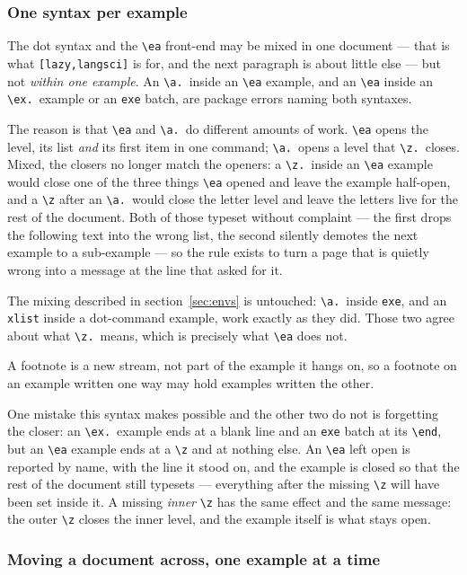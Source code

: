 \documentclass[11pt,a4paper]{article}
\newcommand{\cs}[1]{\texttt{\textbackslash #1}}
\newcommand{\opt}[1]{\texttt{#1}}
\begin{document}
\subsubsection*{One syntax per example}

The dot syntax and the \cs{ea} front-end may be mixed in one document ---
that is what \opt{[lazy,langsci]} is for, and the next paragraph is about
little else --- but not \emph{within one example}. An \cs{a.}\ inside an
\cs{ea} example, and an \cs{ea} inside an \cs{ex.}\ example or an
\texttt{exe} batch, are package errors naming both syntaxes.

The reason is that \cs{ea} and \cs{a.}\ do different amounts of work.
\cs{ea} opens the level, its list \emph{and} its first item in one
command; \cs{a.}\ opens a level that \cs{z.}\ closes. Mixed, the closers
no longer match the openers: a \cs{z.}\ inside an \cs{ea} example would
close one of the three things \cs{ea} opened and leave the example
half-open, and a \cs{z} after an \cs{a.}\ would close the letter level and
leave the letters live for the rest of the document. Both of those
typeset without complaint --- the first drops the following text into the
wrong list, the second silently demotes the next example to a
sub-example --- so the rule exists to turn a page that is quietly wrong
into a message at the line that asked for it.

The mixing described in section~\ref{sec:envs} is untouched: \cs{a.}\
inside \texttt{exe}, and an \texttt{xlist} inside a dot-command example,
work exactly as they did. Those two agree about what \cs{z.}\ means,
which is precisely what \cs{ea} does not.

A footnote is a new stream, not part of the example it hangs on, so a
footnote on an example written one way may hold examples written the
other.

One mistake this syntax makes possible and the other two do not is
forgetting the closer: an \cs{ex.}\ example ends at a blank line and an
\texttt{exe} batch at its \cs{end}, but an \cs{ea} example ends at a
\cs{z} and at nothing else. An \cs{ea} left open is reported by name, with
the line it stood on, and the example is closed so that the rest of the
document still typesets --- everything after the missing \cs{z} will have
been set inside it. A missing \emph{inner} \cs{z} has the same effect and
the same message: the outer \cs{z} closes the inner level, and the example
itself is what stays open.

\subsubsection*{Moving a document across, one example at a time}
\end{document}
